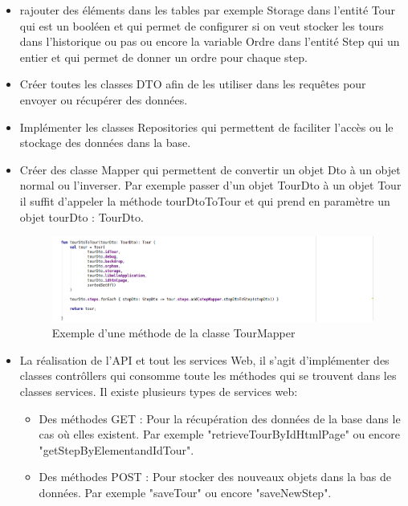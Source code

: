 \documentclass[12pt]{article}
\begin{document}
\begin{itemize}

\item rajouter des éléments dans les tables par exemple Storage dans l'entité Tour qui est un booléen et qui permet de configurer si on veut stocker les tours dans l'historique ou pas ou encore la variable Ordre dans l'entité Step qui un entier et qui permet de donner un ordre pour chaque step.  
\item Créer toutes les classes DTO afin de les utiliser dans les requêtes  pour envoyer ou récupérer des données.

\item Implémenter les classes Repositories qui permettent de faciliter l'accès  ou le stockage des données dans la base.

\item Créer des classe Mapper qui permettent de convertir un objet Dto à un objet normal ou l'inverser. Par exemple passer d'un objet TourDto à un objet Tour il suffit d'appeler la méthode tourDtoToTour et qui prend en paramètre un objet tourDto : TourDto.  

 \begin{figure}[H]
	\centering
 		\includegraphics[width=1\textwidth]{diagrammes/Exemple_tourDtoToTour.png} 
  		\caption{Exemple d'une méthode de la classe TourMapper}
	\end{figure}

\item La réalisation de l'API et tout les services Web, il s'agit d’implémenter des classes contrôllers qui consomme toute les méthodes qui se trouvent dans les classes services. Il existe plusieurs types de services web: 
\begin{itemize}
\item Des méthodes GET : Pour la récupération des données de la base dans le cas où elles existent. Par exemple "retrieveTourByIdHtmlPage" ou encore "getStepByElementandIdTour".

\item Des méthodes POST : Pour stocker des nouveaux objets dans la bas de données. Par exemple "saveTour" ou encore "saveNewStep".


\end{itemize}
\end{itemize}
\end{document}
